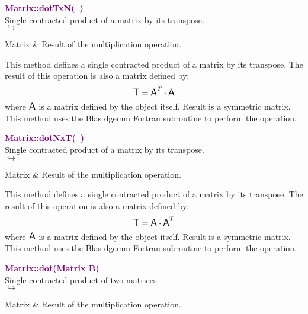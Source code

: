 \textcolor{purple}{\textbf{Matrix::dotTxN(~)}}\label{Matrix::dotTxN()}\\
Single contracted product of a matrix by its transpose.\\ \hspace*{5mm}$\hookrightarrow$
\vspace*{-2em}\begin{tcolorbox}[grow to left by=-1cm, width=\textwidth-1cm,myArgs,tabularx={l|R}]
Matrix & Result of the multiplication operation.
\end{tcolorbox}

This method defines a single contracted product of a matrix by its transpose.
The result of this operation is also a matrix defined by:
\begin{equation*}
\mbox{\large\ensuremath{\mathsf{T}}} = \mbox{\large\ensuremath{\mathsf{A}}}^T\cdot \mbox{\large\ensuremath{\mathsf{A}}}
\end{equation*}
where $\mbox{\large\ensuremath{\mathsf{A}}}$ is a matrix defined by the object itself. Result is a symmetric matrix.
This method uses the Blas \textsf{dgemm} Fortran subroutine to perform the operation.

\textcolor{purple}{\textbf{Matrix::dotNxT(~)}}\label{Matrix::dotNxT()}\\
Single contracted product of a matrix by its transpose.\\ \hspace*{5mm}$\hookrightarrow$
\vspace*{-2em}\begin{tcolorbox}[grow to left by=-1cm, width=\textwidth-1cm,myArgs,tabularx={l|R}]
Matrix & Result of the multiplication operation.
\end{tcolorbox}

This method defines a single contracted product of a matrix by its transpose.
The result of this operation is also a matrix defined by:
\begin{equation*}
\mbox{\large\ensuremath{\mathsf{T}}} = \mbox{\large\ensuremath{\mathsf{A}}} \cdot \mbox{\large\ensuremath{\mathsf{A}}}^T
\end{equation*}
where $\mbox{\large\ensuremath{\mathsf{A}}}$ is a matrix defined by the object itself. Result is a symmetric matrix.
This method uses the Blas \textsf{dgemm} Fortran subroutine to perform the operation.

\textcolor{purple}{\textbf{Matrix::dot(Matrix B)}}\label{Matrix::dot(Matrix B)}\\
Single contracted product of two matrices.\\ \hspace*{5mm}$\hookrightarrow$
\vspace*{-2em}\begin{tcolorbox}[grow to left by=-1cm, width=\textwidth-1cm,myArgs,tabularx={l|R}]
Matrix & Result of the multiplication operation.
\end{tcolorbox}

